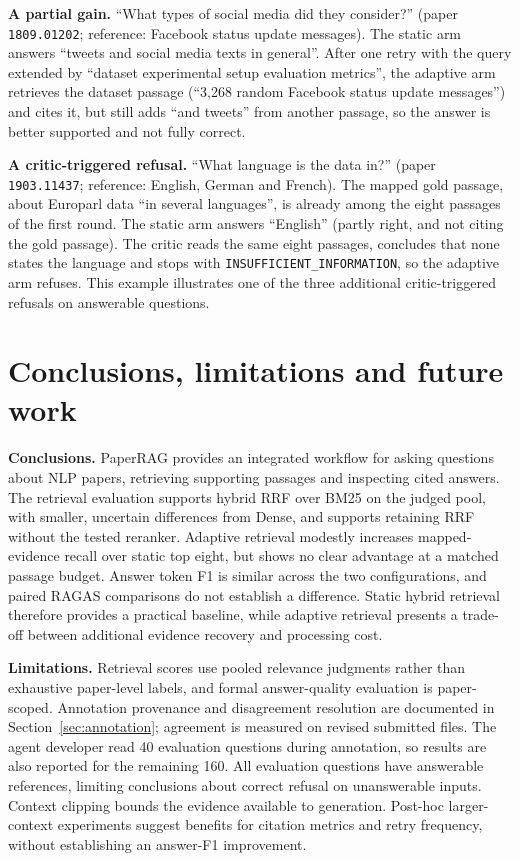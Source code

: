 \textbf{A partial gain.} ``What types of social media did they consider?'' (paper \texttt{1809.01202}; reference: Facebook status update messages). The static arm answers ``tweets and social media texts in general''. After one retry with the query extended by ``dataset experimental setup evaluation metrics'', the adaptive arm retrieves the dataset passage (``3,268 random Facebook status update messages'') and cites it, but still adds ``and tweets'' from another passage, so the answer is better supported and not fully correct.

\begin{samepage}
\textbf{A critic-triggered refusal.} ``What language is the data in?'' (paper \texttt{1903.11437}; reference: English, German and French). The mapped gold passage, about Europarl data ``in several languages'', is already among the eight passages of the first round. The static arm answers ``English'' (partly right, and not citing the gold passage). The critic reads the same eight passages, concludes that none states the language and stops with \texttt{INSUFFICIENT\_INFORMATION}, so the adaptive arm refuses. This example illustrates one of the three additional critic-triggered refusals on answerable questions.\par
\end{samepage}

% 

\section{Conclusions, limitations and future work}
\textbf{Conclusions.} PaperRAG provides an integrated workflow for asking questions about NLP papers, retrieving supporting passages and inspecting cited answers. The retrieval evaluation supports hybrid RRF over BM25 on the judged pool, with smaller, uncertain differences from Dense, and supports retaining RRF without the tested reranker. Adaptive retrieval modestly increases mapped-evidence recall over static top eight, but shows no clear advantage at a matched passage budget. Answer token F1 is similar across the two configurations, and paired RAGAS comparisons do not establish a difference. Static hybrid retrieval therefore provides a practical baseline, while adaptive retrieval presents a trade-off between additional evidence recovery and processing cost.

\textbf{Limitations.} Retrieval scores use pooled relevance judgments rather than exhaustive paper-level labels, and formal answer-quality evaluation is paper-scoped. Annotation provenance and disagreement resolution are documented in Section~\ref{sec:annotation}; agreement is measured on revised submitted files. The agent developer read 40 evaluation questions during annotation, so results are also reported for the remaining 160. All evaluation questions have answerable references, limiting conclusions about correct refusal on unanswerable inputs. Context clipping bounds the evidence available to generation. Post-hoc larger-context experiments suggest benefits for citation metrics and retry frequency, without establishing an answer-F1 improvement.

